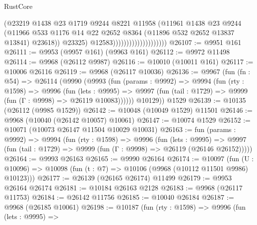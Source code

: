 \begin{lexlean}{RustCore}
\begin{coremodule}
                                            (@23219
                                              @1438
                                              @23
                                              @1719
                                              @9244
                                              @8221
                                              @11958
                                              (@11961
                                                @1438
                                                @23
                                                @9244
                                                (@11966
                                                  @533
                                                  @1176
                                                  @14
                                                  @22
                                                  @2652
                                                  @8364
                                                  (@11896 @532 @2652 @13837 @13841)
                                                  @23618))
                                              @23325)
                                            @12583))))))))))))))))))))
@26107 := @9951 @161
@26111 := @9953 (@9957 @161) (@9963 @161)
@26112 := @9972 @11498
@26114 := @9968 (@26112 @9987)
@26116 := @10010 (@10011 @161)
@26117 := @10006 @26116
@26119 := @9968 (@26117 @10036)
@26136 := @9967
    (fun (fn : @54) =>
    @26114
      (@9990
        (@9993
          (fun (params : @9992) =>
          @9994
            (fun (rty : @1598) =>
            @9996
              (fun (lets : @9995) =>
              @9997 (fun (tail : @1729) => @9999 (fun (Γ : @9998) => @26119 @10083))))))
        @10129))
    @1529
@26139 := @10135 (@26112 (@9985 @1529))
@26142 := @10048 (@10049 @1529) @11501
@26146 := @9968 (@10040 (@26142 @10057) @10061)
@26147 := @10074 @1529
@26152 := @10071 (@10073 @26147 @11504 @10029 @10031)
@26163 := fun (params : @9992) =>
  @9994
    (fun (rty : @1598) =>
    @9996
      (fun (lets : @9995) =>
      @9997 (fun (tail : @1729) => @9999 (fun (Γ : @9998) => @26119 (@26146 @26152)))))
@26164 := @9993 @26163
@26165 := @9990 @26164
@26174 := @10097
    (fun (U : @10096) => @10098 (fun (t : @7) => @10106 (@9968 (@10112 @11501 @9986) @10123)))
@26177 := @26139 (@26165 @26174) @11499
@26179 := @9953 @26164 @26174
@26181 := @10184 @26163 @2128
@26183 := @9968 (@26117 @11753)
@26184 := @26142 @11756
@26185 := @10040 @26184
@26187 := @9968 (@26185 @10061)
@26198 := @10187
    (fun (rty : @1598) =>
    @9996
      (fun (lets : @9995) =>

\end{coremodule}
\end{lexlean}
